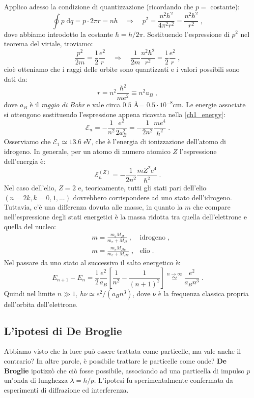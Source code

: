 \documentclass[10pt,a4paper]{report}
\theoremstyle{definition}
\numberwithin{equation}{section}
\newcommand{\diff}[1][]{\mathrm{d}#1}
\begin{document}
Applico adesso la condizione di quantizzazione (ricordando che $p=$ costante):
$$
\oint p\;\diff{q}=p\cdot 2\pi r=nh\quad  \Longrightarrow\quad  p^2=\frac{n^2 h^2}{4\pi^2 r^2}=\frac{n^2 \hbar^2}{r^2}\;,
$$
dove abbiamo introdotto la costante $\hbar=h/2\pi$. Sostituendo l'espressione di $p^2$ nel teorema del viriale, troviamo:
$$
\frac{p^2}{2m}=\frac{1}{2}\frac{e^2}{r}\quad  \Longrightarrow \quad \frac{1}{2m}\frac{n^2\hbar^2}{r^2}=\frac{1}{2}\frac{e^2}{r}\;,
$$
cioè otteniamo che i raggi delle orbite sono quantizzati e i valori possibili sono dati da:
\begin{equation}
r=n^2\frac{\hbar^2}{me^2}\equiv n^2 a_B\;,
\end{equation}
dove $a_B$ è il \textit{raggio di Bohr} e vale circa $0.5$ \AA= $0.5\cdot 10^{-8}$cm. Le energie associate si ottengono sostituendo l'espressione appena ricavata nella \eqref{ch1_energy}:
\begin{equation}
\mathcal{E}_n =-\frac{1}{n^2}\frac{e^2}{2a_B^2}=-\frac{1}{2n^2}\frac{me^4}{\hbar^2}\;.
\end{equation}
Osserviamo che $\mathcal{E}_1\simeq 13.6$ eV, che è l'energia di ionizzazione dell'atomo di idrogeno. In generale, per un atomo di numero atomico $Z$ l'espressione dell'energia è:
\begin{equation}
\mathcal{E}_n^{(Z)}=-\frac{1}{2n^2}\frac{mZ^2e^4}{\hbar^2}\;.
\end{equation}
Nel caso dell'elio, $Z=2$ e, teoricamente, tutti gli stati pari dell'elio $(n=2k, k=0,1,\ldots)$ dovrebbero corrispondere ad uno stato dell'idrogeno. Tuttavia, c'è una differenza dovuta alle masse, in quanto la $m$ che compare nell'espressione degli stati energetici è la massa ridotta tra quella dell'elettrone e quella del nucleo:
\begin{align*}
&m=\frac{m_eM_H}{m_e+M_H}\;, &\mbox{idrogeno}\;, \\
&m=\frac{m_eM_{He}}{m_e+M_{He}}\;, &\mbox{elio}\;.
\end{align*}
Nel passare da uno stato al successivo il salto energetico è:
$$
E_{n+1}-E_n=\frac{1}{2}\frac{e^2}{a_B}\left[\frac{1}{n^2}-\frac{1}{(n+1)^2}\right] \stackrel{n\to\infty}{\simeq} \frac{e^2}{a_Bn^3}\;.
$$
Quindi nel limite $n\gg 1$, $h\nu \simeq e^2/(a_Bn^3)$, dove $\nu$ è la frequenza classica propria dell'orbita dell'elettrone.
\subsection{L'ipotesi di De Broglie}
Abbiamo visto che la luce può essere trattata come particelle, ma vale anche il contrario? In altre parole, è possibile trattare le particelle come onde? \textbf{De Broglie} ipotizzò che ciò fosse possibile, associando ad una particella di impulso $p$ un'onda di lunghezza $\lambda=h/p$. L'ipotesi fu sperimentalmente confermata da esperimenti di diffrazione ed interferenza.
\end{document}
